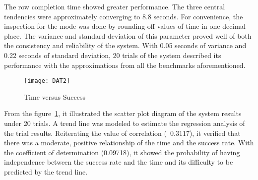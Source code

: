 The row completion time showed greater performance. The three central tendencies were approximately converging to 8.8 seconds. For convenience, the inspection for the mode was done by rounding-off values of time in one decimal place. The variance and standard deviation of this parameter proved well of both the consistency and reliability of the system. With 0.05 seconds of variance and 0.22 seconds of standard deviation, 20 trials of the system described its performance with the approximations from all the benchmarks aforementioned.

\begin{figure}[!htbp]
	\centering
		\texttt{[image: DAT2]}
	\caption{Time versus Success }
	\label{fig:DAT2}
\end{figure}

From the figure~\ref{fig:DAT2}, it illustrated the scatter plot diagram of the system results under 20 trials. A trend line was modeled to estimate the regression analysis of the trial results. Reiterating the value of correlation (~0.3117), it verified that there was a moderate, positive relationship of the time and the success rate. With the coefficient of determination (0.09718), it showed the probability of having independence between the success rate and the time and its difficulty to be predicted by the trend line.